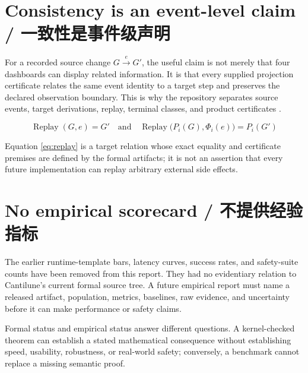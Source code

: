 \section{Consistency is an event-level claim / 一致性是事件级声明}

For a recorded source change \(G\xrightarrow{e}G'\), the useful claim is not merely that four
dashboards can display related information. It is that every supplied projection certificate
relates the same event identity to a target step and preserves the declared observation boundary.
This is why the repository separates source events, target derivations, replay, terminal classes,
and product certificates \citep{cantiluneRFCTwo}.

\begin{equation}
  \operatorname{Replay}(G,e)=G'
  \quad\text{and}\quad
  \operatorname{Replay}\bigl(P_i(G),\Phi_i(e)\bigr)=P_i(G')
  \label{eq:replay}
\end{equation}

Equation \cref{eq:replay} is a target relation whose exact equality and certificate premises are
defined by the formal artifacts; it is not an assertion that every future implementation can
replay arbitrary external side effects.

\section{No empirical scorecard / 不提供经验指标}

The earlier runtime-template bars, latency curves, success rates, and safety-suite counts have
been removed from this report. They had no evidentiary relation to Cantilune's current formal
source tree. A future empirical report must name a released artifact, population, metrics,
baselines, raw evidence, and uncertainty before it can make performance or safety claims.

\begin{MWInsight}
Formal status and empirical status answer different questions. A kernel-checked theorem can
establish a stated mathematical consequence without establishing speed, usability, robustness,
or real-world safety; conversely, a benchmark cannot replace a missing semantic proof.
\end{MWInsight}
